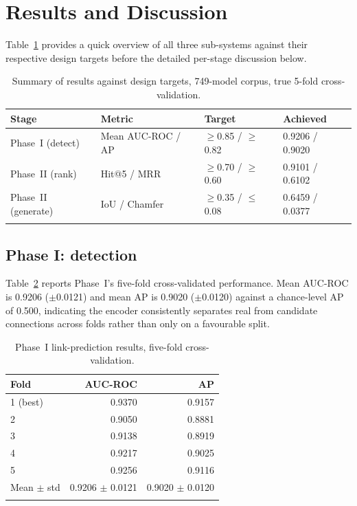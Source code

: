\documentclass[sn-mathphys,Numbered]{sn-jnl}
\begin{document}
\section{Results and Discussion}\label{sec:results}

Table~\ref{tab:summary} provides a quick overview of all three sub-systems against their respective design targets before the detailed per-stage discussion below.

\begin{table}[h]
\caption{Summary of results against design targets, 749-model corpus, true 5-fold cross-validation.}\label{tab:summary}
\begin{tabular}{@{}llll@{}}
\toprule
Stage & Metric & Target & Achieved \\
\midrule
Phase~I (detect)   & Mean AUC-ROC / AP & $\geq$0.85 / $\geq$0.82 & 0.9206 / 0.9020 \\
Phase~II (rank)    & Hit@5 / MRR       & $\geq$0.70 / $\geq$0.60 & 0.9101 / 0.6102 \\
Phase~II (generate) & IoU / Chamfer     & $\geq$0.35 / $\leq$0.08 & 0.6459 / 0.0377 \\
\botrule
\end{tabular}
\end{table}

\subsection{Phase I: detection}\label{sec:results-phase1}

Table~\ref{tab:phase1} reports Phase~I's five-fold cross-validated performance. Mean AUC-ROC is 0.9206 ($\pm$0.0121) and mean AP is 0.9020 ($\pm$0.0120) against a chance-level AP of 0.500, indicating the encoder consistently separates real from candidate connections across folds rather than only on a favourable split.

\begin{table}[h]
\caption{Phase~I link-prediction results, five-fold cross-validation.}\label{tab:phase1}
\begin{tabular}{@{}lrr@{}}
\toprule
Fold & AUC-ROC & AP \\
\midrule
1 (best) & 0.9370 & 0.9157 \\
2        & 0.9050 & 0.8881 \\
3        & 0.9138 & 0.8919 \\
4        & 0.9217 & 0.9025 \\
5        & 0.9256 & 0.9116 \\
\midrule
Mean $\pm$ std & 0.9206 $\pm$ 0.0121 & 0.9020 $\pm$ 0.0120 \\
\botrule
\end{tabular}
\end{table}
\end{document}
